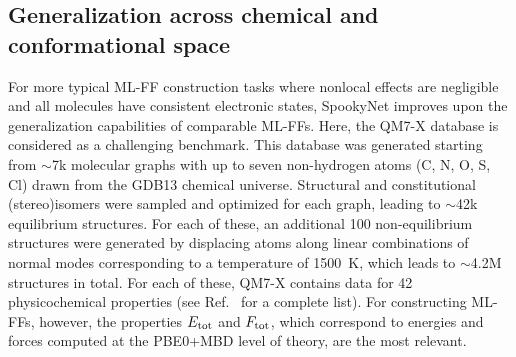 \documentclass[%
superscriptaddress,
reprint,
nofootinbib,
amsmath,amssymb,amsfonts,
floatfix,
altaffilletter,
showkeys,
]{revtex4-2}
\newcommand{\nn}{SpookyNet}
\begin{document}
\subsection*{Generalization across chemical and conformational space}
\label{sec:generalization}
For more typical ML-FF construction tasks where nonlocal effects are negligible and all molecules have consistent electronic states, \nn{} improves upon the generalization capabilities of comparable ML-FFs. Here, the QM7-X database\cite{hoja2021qm7} is considered as a challenging benchmark. This database was generated starting from $\sim$7k molecular graphs with up to seven non-hydrogen atoms (C, N, O, S, Cl) drawn from the GDB13 chemical universe.\cite{blum2009970} Structural and constitutional (stereo)isomers were sampled and optimized for each graph, leading to $\sim$42k equilibrium structures. For each of these, an additional 100 non-equilibrium structures were generated by displacing atoms along linear combinations of normal modes corresponding to a temperature of 1500~K, which leads to $\sim$4.2M structures in total. For each of these, QM7-X contains data for 42 physicochemical properties (see Ref.~ for a complete list). For constructing ML-FFs, however, the properties $E_{\rm tot}$ and $F_{\rm tot}$, which correspond to energies and forces computed at the PBE0+MBD\cite{adamo1999toward,tkatchenko2012accurate} level of theory, are the most relevant. %
\end{document}
